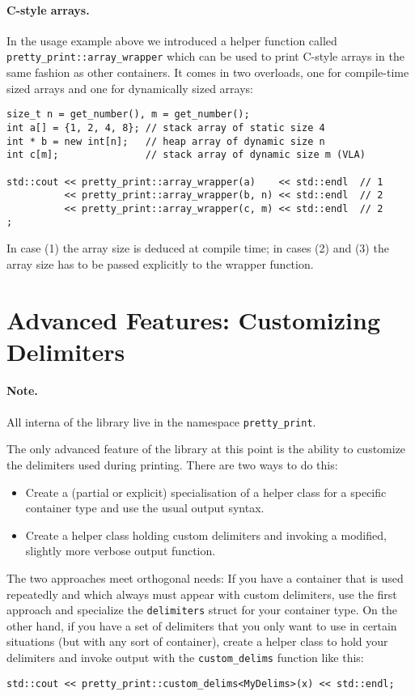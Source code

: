 \documentclass[a4paper,11pt]{article}
\begin{document}
\paragraph{C-style arrays.} In the usage example above we introduced
a helper function called \texttt{pretty\_print::array\_wrapper} which
can be used to print C-style arrays in the same fashion as other
containers. It comes in two overloads, one for compile-time sized
arrays and one for dynamically sized arrays:
\begin{verbatim}
size_t n = get_number(), m = get_number();
int a[] = {1, 2, 4, 8}; // stack array of static size 4
int * b = new int[n];   // heap array of dynamic size n
int c[m];               // stack array of dynamic size m (VLA)

std::cout << pretty_print::array_wrapper(a)    << std::endl  // 1
          << pretty_print::array_wrapper(b, n) << std::endl  // 2
          << pretty_print::array_wrapper(c, m) << std::endl  // 2
;
\end{verbatim}
In case (1) the array size is deduced at compile time; in cases (2) and (3) the
array size has to be passed explicitly to the wrapper function.

\section*{Advanced Features: Customizing Delimiters}

\paragraph{Note.} All interna of the library live in the namespace \texttt{pretty\_print}.\bigskip

The only advanced feature of the library at this point is the ability to customize
the delimiters used during printing. There are two ways to do this:
\begin{itemize}
\item Create a (partial or explicit) specialisation of a helper class
  for a specific container type and use the usual output syntax.
\item Create a helper class holding custom delimiters and invoking
  a modified, slightly more verbose output function.
\end{itemize}

The two approaches meet orthogonal needs: If you have a container that is
used repeatedly and which always must appear with custom delimiters, use the
first approach and specialize the \texttt{delimiters} struct for your container
type. On the other hand, if you have a set of delimiters that you only want to
use in certain situations (but with any sort of container), create a helper class
to hold your delimiters and invoke output with the \texttt{custom\_delims} function
like this:\begin{center}\texttt{std::cout << pretty\_print::custom\_delims<MyDelims>(x) << std::endl;}\end{center}
\end{document}
